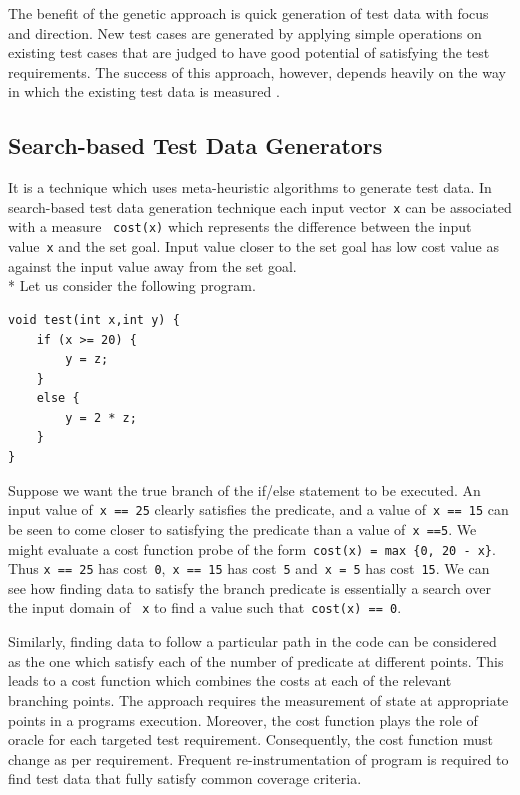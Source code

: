 The benefit of the genetic approach is quick generation of test data with focus and direction. New test cases are generated by applying simple operations on existing test cases that are judged to have good potential of satisfying the test requirements. The success of this approach, however, depends heavily on the way in which the existing test data is measured \cite{pargas1999test}.


\subsection{Search-based Test Data Generators} \label{sec:search_based_2}
It is a technique which uses meta-heuristic algorithms to generate test data. In search-based test data generation technique each input vector~\verb+x+ can be associated with a measure ~\verb+cost(x)+ which represents the difference between the input value~\verb+x+ and the set goal. Input value closer to the set goal has low cost value as against the input value away from the set goal. \\*
Let us consider the following program.


\begin{lstlisting}
void test(int x,int y) {
	if (x >= 20) {
		y = z; 
	}
	else {
		y = 2 * z;
	}
}
\end{lstlisting}

Suppose we want the true branch of the if/else statement to be executed. An input value of~\verb+x == 25+ clearly satisfies the predicate, and a value of~\verb+x == 15+ can be seen to come closer to satisfying the predicate than a value of~\verb+x ==5+. We might evaluate a cost function probe of the form~\verb+cost(x) = max {0, 20 - x}+. Thus \verb+x == 25+ has cost~\verb+0+,~\verb+x == 15+ has cost~\verb+5+ and~\verb+x = 5+ has cost~\verb+15+. We can see how finding data to satisfy the branch predicate is essentially a search over the input domain of ~\verb+x+ to find a value such that~\verb+cost(x) == 0+. 

Similarly, finding data to follow a particular path in the code can be considered as the one which satisfy each of the number of predicate at different points. This leads to a cost function which combines the costs at each of the relevant branching points. The approach requires the measurement of state at appropriate points in a programs execution. Moreover, the cost function plays the role of oracle for each targeted test requirement. Consequently, the cost function must change as per requirement. Frequent re-instrumentation of program is required to find test data that fully satisfy common coverage criteria. 

